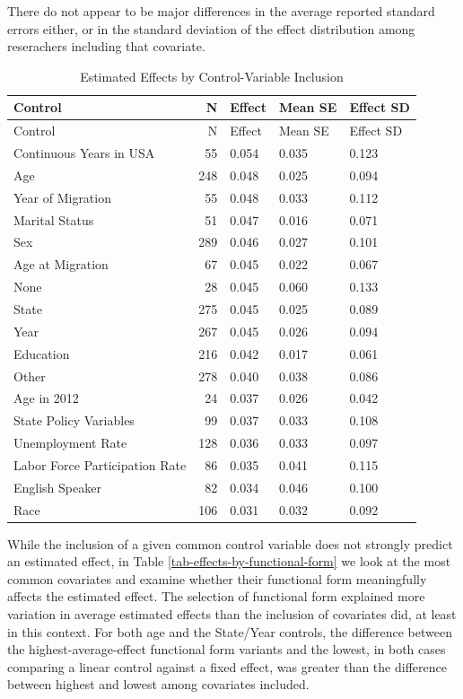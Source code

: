 \documentclass[
  letterpaper,
  DIV=11,
  numbers=noendperiod]{scrartcl}
\begin{document}
There do not appear to be major differences in the average reported
standard errors either, or in the standard deviation of the effect
distribution among reserachers including that covariate.

\begin{longtable}[]{@{}lrlll@{}}
\caption{Estimated Effects by Control-Variable Inclusion
\label{tab-effects-by-controls}}\tabularnewline
\toprule\noalign{}
Control & N & Effect & Mean SE & Effect SD \\
\midrule\noalign{}
\endfirsthead
\toprule\noalign{}
Control & N & Effect & Mean SE & Effect SD \\
\midrule\noalign{}
\endhead
\bottomrule\noalign{}
\endlastfoot
Continuous Years in USA & 55 & 0.054 & 0.035 & 0.123 \\
Age & 248 & 0.048 & 0.025 & 0.094 \\
Year of Migration & 55 & 0.048 & 0.033 & 0.112 \\
Marital Status & 51 & 0.047 & 0.016 & 0.071 \\
Sex & 289 & 0.046 & 0.027 & 0.101 \\
Age at Migration & 67 & 0.045 & 0.022 & 0.067 \\
None & 28 & 0.045 & 0.060 & 0.133 \\
State & 275 & 0.045 & 0.025 & 0.089 \\
Year & 267 & 0.045 & 0.026 & 0.094 \\
Education & 216 & 0.042 & 0.017 & 0.061 \\
Other & 278 & 0.040 & 0.038 & 0.086 \\
Age in 2012 & 24 & 0.037 & 0.026 & 0.042 \\
State Policy Variables & 99 & 0.037 & 0.033 & 0.108 \\
Unemployment Rate & 128 & 0.036 & 0.033 & 0.097 \\
Labor Force Participation Rate & 86 & 0.035 & 0.041 & 0.115 \\
English Speaker & 82 & 0.034 & 0.046 & 0.100 \\
Race & 106 & 0.031 & 0.032 & 0.092 \\
\end{longtable}

While the inclusion of a given common control variable does not strongly
predict an estimated effect, in Table
\ref{tab-effects-by-functional-form} we look at the most common
covariates and examine whether their functional form meaningfully
affects the estimated effect. The selection of functional form explained
more variation in average estimated effects than the inclusion of
covariates did, at least in this context. For both age and the
State/Year controls, the difference between the highest-average-effect
functional form variants and the lowest, in both cases comparing a
linear control against a fixed effect, was greater than the difference
between highest and lowest among covariates included.
\end{document}
